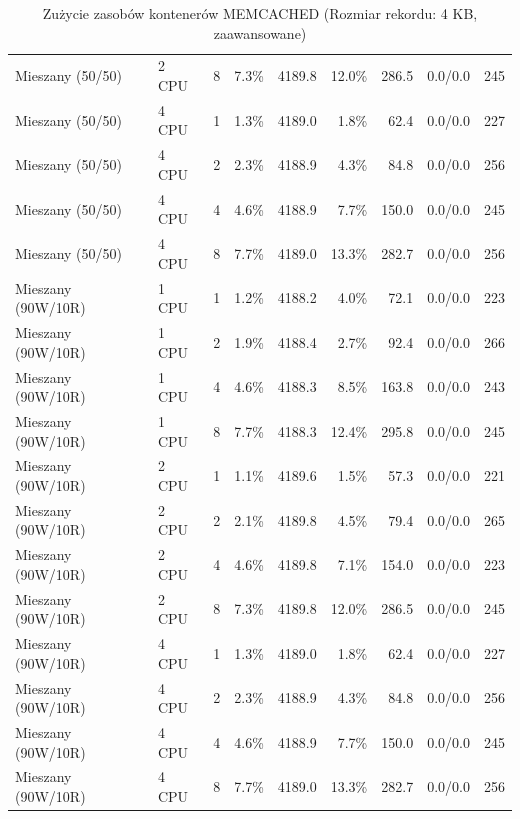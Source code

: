 \begin{table}[ht]
{\begin{tabular}{llcrrrrcc}
Mieszany (50/50) & 2 CPU & 8 & 7.3\% & 4189.8 & 12.0\% & 286.5 & 0.0/0.0 & 245 \\
Mieszany (50/50) & 4 CPU & 1 & 1.3\% & 4189.0 & 1.8\% & 62.4 & 0.0/0.0 & 227 \\
Mieszany (50/50) & 4 CPU & 2 & 2.3\% & 4188.9 & 4.3\% & 84.8 & 0.0/0.0 & 256 \\
Mieszany (50/50) & 4 CPU & 4 & 4.6\% & 4188.9 & 7.7\% & 150.0 & 0.0/0.0 & 245 \\
Mieszany (50/50) & 4 CPU & 8 & 7.7\% & 4189.0 & 13.3\% & 282.7 & 0.0/0.0 & 256 \\
Mieszany (90W/10R) & 1 CPU & 1 & 1.2\% & 4188.2 & 4.0\% & 72.1 & 0.0/0.0 & 223 \\
Mieszany (90W/10R) & 1 CPU & 2 & 1.9\% & 4188.4 & 2.7\% & 92.4 & 0.0/0.0 & 266 \\
Mieszany (90W/10R) & 1 CPU & 4 & 4.6\% & 4188.3 & 8.5\% & 163.8 & 0.0/0.0 & 243 \\
Mieszany (90W/10R) & 1 CPU & 8 & 7.7\% & 4188.3 & 12.4\% & 295.8 & 0.0/0.0 & 245 \\
Mieszany (90W/10R) & 2 CPU & 1 & 1.1\% & 4189.6 & 1.5\% & 57.3 & 0.0/0.0 & 221 \\
Mieszany (90W/10R) & 2 CPU & 2 & 2.1\% & 4189.8 & 4.5\% & 79.4 & 0.0/0.0 & 265 \\
Mieszany (90W/10R) & 2 CPU & 4 & 4.6\% & 4189.8 & 7.1\% & 154.0 & 0.0/0.0 & 223 \\
Mieszany (90W/10R) & 2 CPU & 8 & 7.3\% & 4189.8 & 12.0\% & 286.5 & 0.0/0.0 & 245 \\
Mieszany (90W/10R) & 4 CPU & 1 & 1.3\% & 4189.0 & 1.8\% & 62.4 & 0.0/0.0 & 227 \\
Mieszany (90W/10R) & 4 CPU & 2 & 2.3\% & 4188.9 & 4.3\% & 84.8 & 0.0/0.0 & 256 \\
Mieszany (90W/10R) & 4 CPU & 4 & 4.6\% & 4188.9 & 7.7\% & 150.0 & 0.0/0.0 & 245 \\
Mieszany (90W/10R) & 4 CPU & 8 & 7.7\% & 4189.0 & 13.3\% & 282.7 & 0.0/0.0 & 256 \\
\bottomrule
\end{tabular}%
}
\caption{Zużycie zasobów kontenerów MEMCACHED (Rozmiar rekordu: 4 KB, zaawansowane)}
\label{tab:resources_memcached_medium_0}
\end{table}

